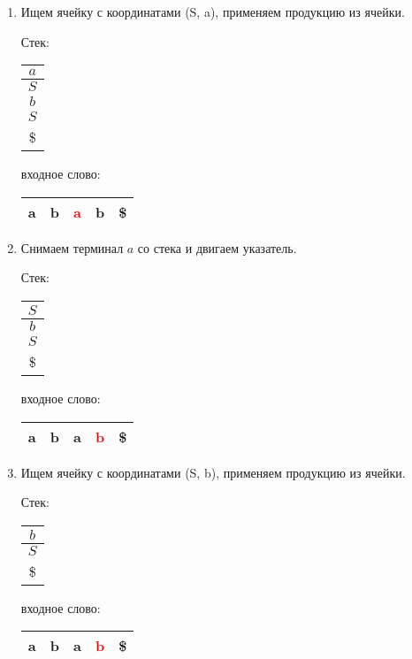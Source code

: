 \begin{example}
\begin{enumerate}
  \item Ищем ячейку с координатами (S, a), применяем продукцию из ячейки.

    Стек: \,
    \begin{tabular}[c]{ |c| } 
        \\ \hline
        $a$ \\ \hline
        $S$ \\ \hline
        $b$ \\ \hline
        $S$ \\ \hline
        \$ \\ \hline
    \end{tabular}  
    \qquad  \qquad \qquad  \qquad входное слово: \,
    \begin{tabular}[c]{ |c|c|c|c|c| } 
        \hline
        a & b & \textcolor{red}{a} & b & \$ \\ \hline
    \end{tabular}

\item Снимаем терминал $a$ со стека и двигаем указатель.
    
    Стек: \,
    \begin{tabular}[c]{ |c| } 
        \\ \hline
        $S$ \\ \hline
        $b$ \\ \hline
        $S$ \\ \hline
        \$ \\ \hline
    \end{tabular}  
    \qquad  \qquad \qquad  \qquad входное слово: \,
    \begin{tabular}[c]{ |c|c|c|c|c| } 
        \hline
        a & b & a & \textcolor{red}{b} & \$ \\ \hline
    \end{tabular}

\item Ищем ячейку с координатами (S, b), применяем продукцию из ячейки.

    Стек: \,
    \begin{tabular}[c]{ |c| } 
        \\ \hline
        $b$ \\ \hline
        $S$ \\ \hline
        \$ \\ \hline
    \end{tabular}  
    \qquad  \qquad \qquad  \qquad входное слово: \,
    \begin{tabular}[c]{ |c|c|c|c|c| } 
        \hline
        a & b & a & \textcolor{red}{b} & \$ \\ \hline
    \end{tabular}


\end{enumerate}
\end{example}
